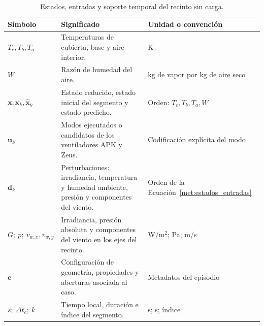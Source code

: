 \begin{table}[htbp]
\centering
\caption{Estados, entradas y soporte temporal del recinto sin carga.}
\label{met:tabla_pinn_variables}
\begingroup
\small
\setlength{\tabcolsep}{4pt}
\renewcommand{\arraystretch}{1.12}
\begin{tabularx}{\textwidth}{@{}>{\raggedright\arraybackslash}p{}>{\raggedright\arraybackslash}X>{\raggedright\arraybackslash}p{}@{}}
\toprule
Símbolo & Significado & Unidad o convención \\
\midrule
$T_c,T_b,T_a$ & Temperaturas de cubierta, base y aire interior. & K \\
$W$ & Razón de humedad del aire. & kg de vapor por kg de aire seco \\
$\mathbf x,\mathbf x_k,\widehat{\mathbf x}_\eta$ & Estado reducido, estado inicial del segmento y estado predicho. & Orden: $T_c,T_b,T_a,W$ \\
$\mathbf u_k$ & Modos ejecutados o candidatos de los ventiladores APK y Zeus. & Codificación explícita del modo \\
$\mathbf d_k$ & Perturbaciones: irradiancia, temperatura y humedad ambiente, presión y componentes del viento. & Orden de la Ecuación~\ref{met:estados_entradas} \\
$G;\ p;\ v_{w,x},v_{w,y}$ & Irradiancia, presión absoluta y componentes del viento en los ejes del recinto. & W/m$^2$; Pa; m/s \\
$\mathbf c$ & Configuración de geometría, propiedades y aberturas asociada al caso. & Metadatos del episodio \\
$s;\ \Delta t_c;\ k$ & Tiempo local, duración e índice del segmento. & s; s; índice \\
\bottomrule
\end{tabularx}
\endgroup
\end{table}
